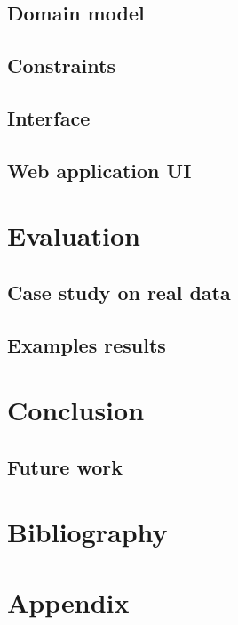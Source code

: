 \documentclass[12pt, a4paper, english]{report}
\begin{document}
\section{Domain model}
\section{Constraints}
\section{Interface}
\section{Web application UI}

\chapter{Evaluation}
\section{Case study on real data}
\section{Examples results}

\chapter{Conclusion}
\section{Future work}

\chapter{Bibliography}

\chapter{Appendix}
\end{document}
